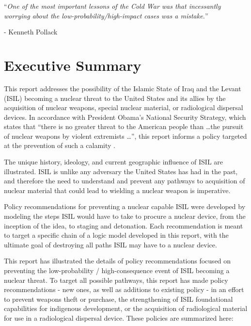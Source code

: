 \documentclass{report}
\begin{document}
\begin{center}
 \enquote{\emph{One of the most important lessons of the Cold War was that incessantly worrying about the low-probability/high-impact cases was a mistake.}}  
 
 
 
 - Kenneth Pollack 

\end{center}

\vspace*{\fill}



\newpage

\pagestyle{fancy2}


\chapter{Executive Summary}






This report addresses the possibility of the Islamic State of Iraq and the Levant (ISIL) becoming a nuclear threat to the United States and its allies by the acquisition of nuclear weapons, special nuclear material, or radiological dispersal devices. In accordance with President Obama's National Security Strategy, which states that \enquote{there is no greater threat to the American people than \ldots the pursuit of nuclear weapons by violent extremists \ldots}, this report informs a policy targeted at the prevention of such a calamity \cite{Obama2010}.


The unique history, ideology, and current geographic influence of ISIL are illustrated. ISIL is unlike any adversary the United States has had in the past, and therefore the need to understand and prevent any pathways to acquisition of nuclear material that could lead to wielding a nuclear weapon is imperative.

Policy recommendations for preventing a nuclear capable ISIL were developed by modeling the steps ISIL would have to take to procure a nuclear device, from the inception of the idea, to staging and detonation. Each recommendation is meant to target a specific chain of a  logic model developed in this report, with the ultimate goal of destroying all paths ISIL may have to a nuclear device. 



This report has illustrated the details of policy recommendations focused on preventing the low-probability / high-consequence event of ISIL becoming a nuclear threat. To target all possible pathways, this report has made policy recommendations - new ones, as well as additions to existing policy - in an effort to prevent weapons theft or purchase, the strengthening of ISIL foundational capabilities for indigenous development, or the acquisition of radiological material for use in a radiological dispersal device. These policies are  summarized here:
\end{document}
